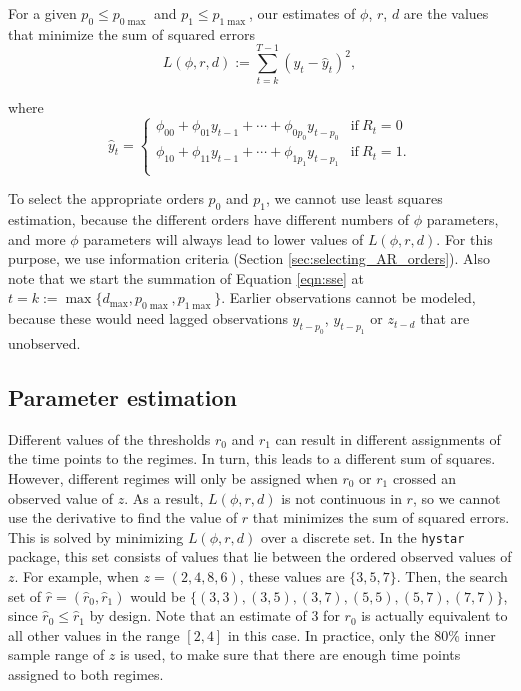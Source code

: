 \documentclass{article}
\begin{document}
For a given $p_0 \le p_{0\max}$ and $p_1 \le p_{1\max}$, our estimates of $\phi$, $r$, $d$ are the values that minimize the sum of squared errors
\begin{equation} \label{eqn:sse}
L(\phi, r, d) := \sum_{t = k}^{T-1} (y_t - \hat{y}_t)^2,
\end{equation}

where
\begin{equation}
\hat{y}_t = 
\begin{cases}
\phi_{00} + \phi_{01} y_{t-1} + \cdots + \phi_{0 p_0} y_{t-p_0} 
& \text{if}~R_{t} = 0\\
\phi_{10} + \phi_{11} y_{t-1} + \cdots + \phi_{1 p_1} y_{t-p_1} 
& \text{if}~R_{t} = 1. \\
\end{cases}
\end{equation}

To select the appropriate orders $p_0$ and $p_1$, we cannot use least squares estimation, because the different orders have different numbers of $\phi$ parameters, and more $\phi$ parameters will always lead to lower values of $L(\phi, r, d)$. For this purpose, we use information criteria (Section \ref{sec:selecting_AR_orders}).
Also note that we start the summation of Equation \ref{eqn:sse} at $t = k :=\max\{d_{\max}, p_{0\max}, p_{1\max}\}$. 
Earlier observations cannot be modeled, because these would need lagged observations $y_{t-p_0}$, $y_{t-p_1}$ or $z_{t-d}$ that are unobserved.

\subsection{Parameter estimation} 
\label{sec:estimation}
Different values of the thresholds $r_0$ and $r_1$ can result in different assignments of the time points to the regimes. In turn, this leads to a different sum of squares. 
However, different regimes will only be assigned when $r_0$ or $r_1$ crossed an observed value of $z$. 
As a result, $L(\phi, r, d)$ is not continuous in $r$, so we cannot use the derivative to find the value of $r$ that minimizes the sum of squared errors.
This is solved by minimizing $L(\phi, r, d)$ over a discrete set. 
In the \texttt{hystar} package, this set consists of values that lie between the ordered observed values of $z$.
For example, when $z = (2, 4, 8, 6)$, these values are $\{3, 5, 7\}$.
Then, the search set of $\hat{r} = (\hat{r}_0, \hat{r}_1)$ would be $\{(3, 3), (3, 5), (3, 7), (5,5), (5, 7), (7, 7)\}$, since $\hat{r}_0 \le \hat{r}_1$ by design. Note that an estimate of 3 for $r_0$ is actually equivalent to all other values in the range $[2, 4]$ in this case.
In practice, only the 80\% inner sample range of $z$ is used, to make sure that there are enough time points assigned to both regimes.
\end{document}
